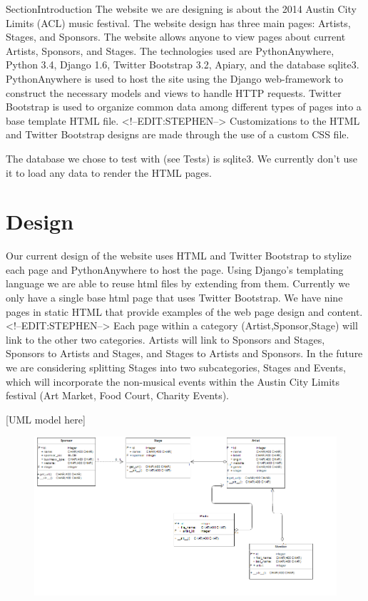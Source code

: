 Section{Introduction} 
The website we are designing is about the 2014 Austin City Limits (ACL) music festival. The website design has three main pages: Artists, Stages, and Sponsors.
The website allows anyone to view pages about current Artists, Sponsors, and Stages. The technologies used are PythonAnywhere, Python 3.4, Django 1.6,
Twitter Bootstrap 3.2, Apiary, and the database sqlite3. PythonAnywhere is used to host the site using the Django web-framework to 
construct the necessary models and views to handle HTTP requests. Twitter Bootstrap is used to organize common data among different
types of pages into a base template HTML file. <!--EDIT:STEPHEN--> Customizations to the HTML and Twitter Bootstrap designs are made through
the use of a custom CSS file.

The database we chose to test with (see Tests) is sqlite3. We currently don't use it to load any data to render the HTML pages.

\section{Design}
Our current design of the website uses HTML and Twitter Bootstrap to stylize each page and PythonAnywhere to host the page. 
Using Django's templating language we are able to reuse html files by extending from them. Currently we only have a single base html page that
uses Twitter Bootstrap. We have nine pages in static HTML that provide examples of the web page design and content. <!--EDIT:STEPHEN--> Each
page within a category (Artist,Sponsor,Stage) will link to the other two categories. Artists will link to Sponsors and Stages, Sponsors to
Artists and Stages, and Stages to Artists and Sponsors. In the future we are considering splitting Stages into two subcategories, Stages and
Events, which will incorporate the non-musical events within the Austin City Limits festival (Art Market, Food Court, Charity Events).

[UML model here]
\begin{figure}[h]
\includegraphics[width=\textwidth]{UML}
\end{figure}

